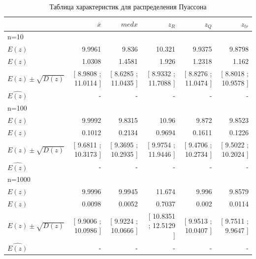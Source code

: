 \documentclass[a4paper,14pt]{article}
\begin{document}
	\begin{table}[H]
		\centering
		\begin{tabular}[t]{|l|r|r|r|r|r|}
			\hline
			& $\overline{x}$ & $med x$ & $z_R$ & $z_Q$ & $z_{tr}$\\\hline\hline
			n=10 & & & & &\\\hline
			$E(z)$  & 9.9961 & 9.836 & 10.321 & 9.9375 & 9.8798  \\\hline
$E(z)$  & 1.0308 & 1.4581 & 1.926 & 1.2318 & 1.162  \\\hline
$E(z)  \pm  \sqrt{D(z)}$  & [ 8.9808 ; 11.0114 ] & [ 8.6285 ; 11.0435 ] & [ 8.9332 ; 11.7088 ] & [ 8.8276 ; 11.0474 ] & [ 8.8018 ; 10.9578 ]  \\\hline
			$\hat{E(z)}$ & - & - & - & - & -\\\hline
			
			n=100 & & & & &\\\hline
			$E(z)$  & 9.9992 & 9.8315 & 10.96 & 9.872 & 9.8523  \\\hline
$E(z)$  & 0.1012 & 0.2134 & 0.9694 & 0.1611 & 0.1226  \\\hline
$E(z)  \pm  \sqrt{D(z)}$  & [ 9.6811 ; 10.3173 ] & [ 9.3695 ; 10.2935 ] & [ 9.9754 ; 11.9446 ] & [ 9.4706 ; 10.2734 ] & [ 9.5022 ; 10.2024 ]  \\\hline
			$\hat{E(z)}$ & - & - & - & - & -\\\hline
			
			n=1000 & & & & &\\\hline
			$E(z)$  & 9.9996 & 9.9945 & 11.674 & 9.996 & 9.8579  \\\hline
$E(z)$  & 0.0098 & 0.0052 & 0.7037 & 0.002 & 0.0114  \\\hline
$E(z)  \pm  \sqrt{D(z)}$  & [ 9.9006 ; 10.0986 ] & [ 9.9224 ; 10.0666 ] & [ 10.8351 ; 12.5129 ] & [ 9.9513 ; 10.0407 ] & [ 9.7511 ; 9.9647 ]  \\\hline
			$\hat{E(z)}$ & - & - & - & - & -\\\hline
			
		\end{tabular}
		\caption{Таблица характеристик для распределения Пуассона}
		\label{tab:poisson}
	\end{table}
	
\end{document}
